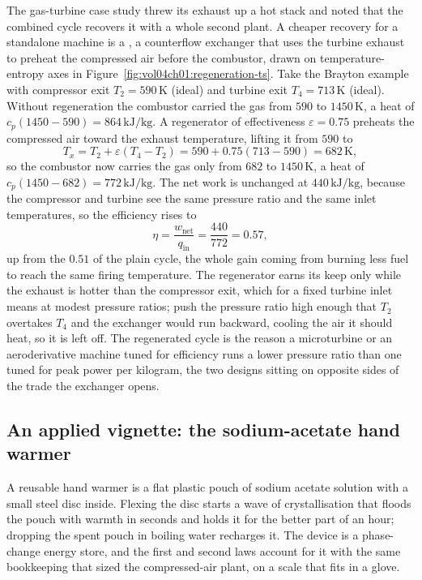 The gas-turbine case study threw its exhaust up a hot stack and noted that the
combined cycle recovers it with a whole second plant. A cheaper recovery for a
standalone machine is a , a counterflow exchanger that uses the
turbine exhaust to preheat the compressed air before the combustor, drawn on
temperature-entropy axes in Figure~\ref{fig:vol04ch01:regeneration-ts}. Take the
Brayton example with compressor exit $T_2 = 590\,\si{\kelvin}$ (ideal) and turbine
exit $T_4 = 713\,\si{\kelvin}$ (ideal). Without regeneration the combustor carried
the gas from $590$ to $1450\,\si{\kelvin}$, a heat of $c_p(1450 - 590) =
864\,\text{kJ}/\text{kg}$. A regenerator of effectiveness $\varepsilon = 0.75$
preheats the compressed air toward the exhaust temperature, lifting it from $590$ to
\[
T_x = T_2 + \varepsilon(T_4 - T_2) = 590 + 0.75(713 - 590) = 682\,\si{\kelvin},
\]
so the combustor now carries the gas only from $682$ to $1450\,\si{\kelvin}$, a heat
of $c_p(1450 - 682) = 772\,\text{kJ}/\text{kg}$. The net work is unchanged at
$440\,\text{kJ}/\text{kg}$, because the compressor and turbine see the same pressure
ratio and the same inlet temperatures, so the efficiency rises to
\[
\eta = \frac{w_{\text{net}}}{q_{\text{in}}} = \frac{440}{772} = 0.57,
\]
up from the $0.51$ of the plain cycle, the whole gain coming from burning less fuel
to reach the same firing temperature. The regenerator earns its keep only while the
exhaust is hotter than the compressor exit, which for a fixed turbine inlet means at
modest pressure ratios; push the pressure ratio high enough that $T_2$ overtakes
$T_4$ and the exchanger would run backward, cooling the air it should heat, so it is
left off. The regenerated cycle is the reason a microturbine or an aeroderivative
machine tuned for efficiency runs a lower pressure ratio than one tuned for peak
power per kilogram, the two designs sitting on opposite sides of the trade the
exchanger opens.



\subsection*{An applied vignette: the sodium-acetate hand warmer}

A reusable hand warmer is a flat plastic pouch of sodium acetate solution
with a small steel disc inside. Flexing the disc starts a wave of
crystallisation that floods the pouch with warmth in seconds and holds it for
the better part of an hour; dropping the spent pouch in boiling water
recharges it. The device is a phase-change energy store, and the first and
second laws account for it with the same bookkeeping that sized the
compressed-air plant, on a scale that fits in a glove.


